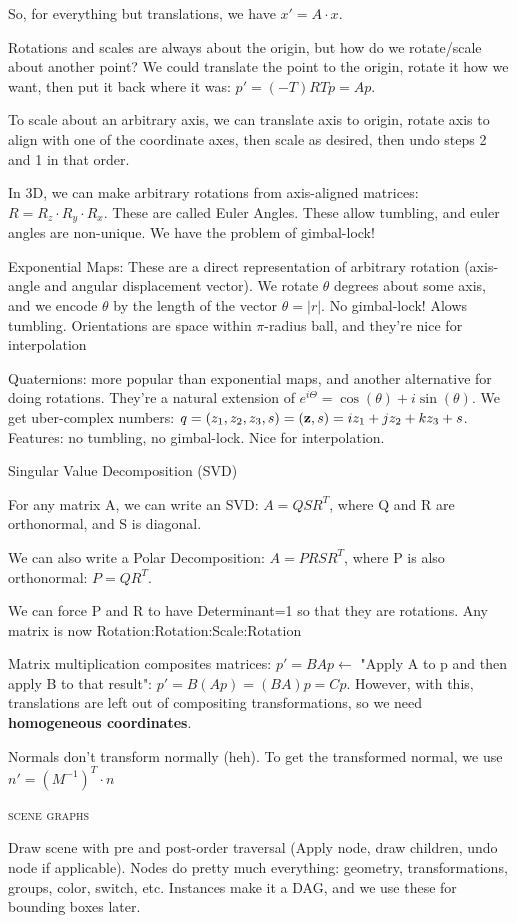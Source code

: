 \documentclass{article}
\begin{document}
So, for everything but translations, we have $x'=A\cdot x$.

Rotations and scales are always about the origin, but how do we rotate/scale about another point? We could translate the point to the origin, rotate it how we want, then put it back where it was: $p'=(-T)RTp=Ap$.

To scale about an arbitrary axis, we can translate axis to origin, rotate axis to align with one of the coordinate axes, then scale as desired, then undo steps 2 and 1 in that order.

In 3D, we can make arbitrary rotations from axis-aligned matrices: $R=R_z\cdot R_y\cdot R_x$. These are called Euler Angles. These allow tumbling, and euler angles are non-unique. We have the problem of gimbal-lock!

\vspace{10pt}
Exponential Maps: These are a direct representation of arbitrary rotation (axis-angle and angular displacement vector). We rotate $\theta$ degrees about some axis, and we encode $\theta$ by the length of the vector $\theta=|r|$.  No gimbal-lock! Alows tumbling. Orientations are space within $\pi$-radius ball, and they're nice for interpolation

\vspace{10pt}
Quaternions: more popular than exponential maps, and another alternative for doing rotations. They're a natural extension of $e^{i\Theta}=\cos(\theta)+i\sin(\theta)$. We get uber-complex numbers: $q=(z_1,z_2,z_3,s)=({\bf z},s) = iz_1+jz_2+kz_3+s$. 
Features: no tumbling, no gimbal-lock. Nice for interpolation.

\vspace{10pt}
Singular Value Decomposition (SVD)

For any matrix A, we can write an SVD: $A=QSR^T$, where Q and R are orthonormal, and S is diagonal.

We can also write a Polar Decomposition: $A=PRSR^T$, where P is also orthonormal: $P=QR^T$.

We can force P and R to have Determinant=1 so that they are rotations. Any matrix is now Rotation:Rotation:Scale:Rotation

Matrix multiplication composites matrices: $p'=BAp \leftarrow $ "Apply A to p and then apply B to that result": $p'=B(Ap)=(BA)p=Cp$. However, with this, translations are left out of compositing transformations, so we need {\bf homogeneous coordinates}.

Normals don't transform normally (heh). To get the transformed normal, we use $n' = (M^{-1})^T\cdot n$
\begin{center}\textsc{scene graphs}\end{center} 
Draw scene with pre and post-order traversal (Apply node, draw children, undo node if applicable). Nodes do pretty much everything: geometry, transformations, groups, color, switch, etc. Instances make it a DAG, and we use these for bounding boxes later.
\end{document}
